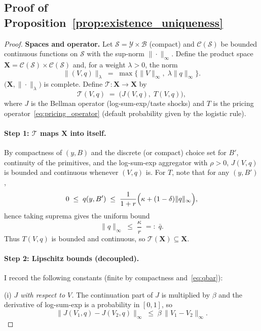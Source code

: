\documentclass[12pt]{article}
\providecommand{\eqqcolon}{=\mathrel{\mathop:}}
\theoremstyle{plain}
\begin{document}
\subsection{Proof of Proposition~\ref{prop:existence_uniqueness}}
\label{app:proof_existence_uniqueness}

\begin{proof}
	\textbf{Spaces and operator.}
	Let $\mathcal S=\mathcal Y\times\mathcal B$ (compact) and
	$\mathcal C(\mathcal S)$ be bounded continuous functions on $\mathcal S$ with the sup-norm $\|\cdot\|_\infty$.
	Define the product space $\mathbf X=\mathcal C(\mathcal S)\times\mathcal C(\mathcal S)$ and, for a weight $\lambda>0$, the norm
	\[
		\|(V,q)\|_\lambda \;=\; \max\{\|V\|_\infty,\;\lambda\|q\|_\infty\}.
	\]
	$\bigl(\mathbf X,\|\cdot\|_\lambda\bigr)$ is complete.
	Define $\mathcal T:\mathbf X\to\mathbf X$ by
	\[
		\mathcal T(V,q) \;=\; \bigl(J(V,q),\;T(V,q)\bigr),
	\]
	where $J$ is the Bellman operator (log-sum-exp/taste shocks) and $T$ is the
	pricing operator~\eqref{eq:pricing_operator} (default probability given by the
	logistic rule).

	\paragraph{Step 1: $\mathcal T$ maps $\mathbf X$ into itself.}
	By compactness of $(y,B)$ and the discrete (or compact) choice set for $B'$,
	continuity of the primitives, and the log-sum-exp aggregator with $\rho>0$,
	$J(V,q)$ is bounded and continuous whenever $(V,q)$ is. For $T$, note that for
	any $(y,B')$,
	\[
		0 \;\le\; q(y,B') \;\le\; \frac{1}{1+r}\Bigl(\kappa + (1-\delta)\|q\|_\infty\Bigr),
	\]
	hence taking suprema gives the uniform bound
	\begin{equation}
		\label{eq:qbar}
		\|q\|_\infty \;\le\; \frac{\kappa}{r}\;\eqqcolon\;\bar q.
	\end{equation}
	Thus $T(V,q)$ is bounded and continuous, so $\mathcal T(\mathbf X)\subseteq\mathbf X$.

	\paragraph{Step 2: Lipschitz bounds (decoupled).}
	I record the following constants (finite by compactness and~\eqref{eq:qbar}):

	\medskip
	(i) \emph{$J$ with respect to $V$.}
	The continuation part of $J$ is multiplied by $\beta$ and the derivative of log-sum-exp is a probability in $[0,1]$, so
	\[
		\|J(V_1,q)-J(V_2,q)\|_\infty \;\le\; \beta\,\|V_1-V_2\|_\infty.
	\]


\end{proof}
\end{document}
